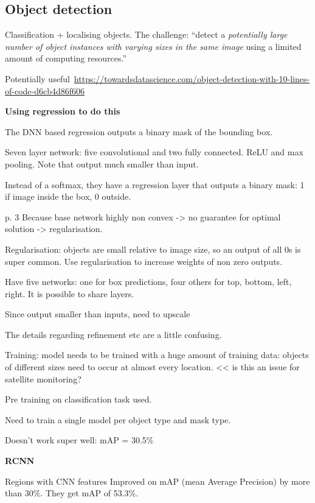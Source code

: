 \documentclass[12pt, a4paper, oneside, headinclude, footinclude]{article}
\begin{document}
\subsection{Object detection}

Classification + localising objects. The challenge: ``detect a \textit{potentially large
number of object instances with varying sizes in the same image} using a
limited amount of computing resources.''~\cite[Their emphasis]{NIPS2013_5207}

Potentially
useful~\url{https://towardsdatascience.com/object-detection-with-10-lines-of-code-d6cb4d86f606}

\textbf{Using regression to do this}~\cite{NIPS2013_5207}

The DNN based regression outputs a binary mask of the bounding box. 

Seven layer network: five convolutional and two fully connected. ReLU and max
pooling. Note that output much smaller than input.

Instead of a softmax, they have a regression layer that outputs a binary mask:
1 if image inside the box, 0 outside.\ 

p. 3 Because base network highly non convex -> no guarantee for optimal solution ->
regularisation.

Regularisation: objects are small relative to image size, so an output of all
0s is super common. Use regularisation to increase weights of non zero
outputs.

Have five networks: one for box predictions, four others for {top, bottom,
left, right}. 
It is possible to share layers. 

Since output smaller than inputs, need to upscale

The details regarding refinement etc are a little confusing. 

Training: model needs to be trained with a huge amount of training data:
objects of different sizes need to occur at almost every location. << is this
an issue for satellite monitoring?

Pre training on classification task used.

Need to train a single model per object type and mask type.

Doesn't work super well: mAP = 30.5\%

\textbf{RCNN}~\cite{Girshick2014, Girshick2015}

Regions with CNN features
Improved on mAP (mean Average Precision) by more than 30\%. They get mAP of
53.3\%. 
\end{document}
